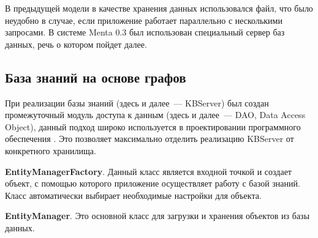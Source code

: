 В предыдущей модели в качестве хранения данных использовался файл, что было неудобно в случае, если приложение работает параллельно с несколькими запросами. В системе Menta 0.3 был использован специальный сервер баз данных, речь о котором пойдет далее.

\subsection{База знаний на основе графов}
При реализации базы знаний (здесь и далее~--- KBServer) был создан промежуточный модуль доступа к данным (здесь и далее~--- DAO, Data Access Object), данный подход широко используется в проектировании программного обеспечения \cite{THREELAYERARCH}. Это позволяет максимально отделить реализацию KBServer от конкретного хранилища. \par 

\textbf{EntityManagerFactory}. Данный класс является входной точкой и создает объект, с помощью которого приложение осуществляет работу с базой знаний. Класс автоматически выбирает необходимые настройки для объекта. \par

\textbf{EntityManager}. Это основной класс для загрузки и хранения объектов из базы данных.\par

